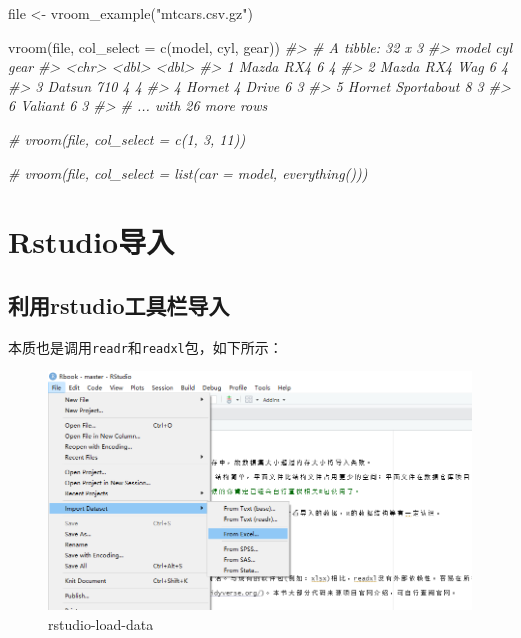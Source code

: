 \documentclass[
]{book}
\newenvironment{Shaded}{\begin{snugshade}}{\end{snugshade}}
\newcommand{\AttributeTok}[1]{\textcolor[rgb]{0.77,0.63,0.00}{#1}}
\newcommand{\CommentTok}[1]{\textcolor[rgb]{0.56,0.35,0.01}{\textit{#1}}}
\newcommand{\FunctionTok}[1]{\textcolor[rgb]{0.00,0.00,0.00}{#1}}
\newcommand{\NormalTok}[1]{#1}
\newcommand{\OtherTok}[1]{\textcolor[rgb]{0.56,0.35,0.01}{#1}}
\newcommand{\StringTok}[1]{\textcolor[rgb]{0.31,0.60,0.02}{#1}}
\begin{document}
\begin{Shaded}
\begin{Highlighting}[]
\NormalTok{file }\OtherTok{\textless{}{-}} \FunctionTok{vroom\_example}\NormalTok{(}\StringTok{"mtcars.csv.gz"}\NormalTok{)}

\FunctionTok{vroom}\NormalTok{(file, }\AttributeTok{col\_select =} \FunctionTok{c}\NormalTok{(model, cyl, gear))}
\CommentTok{\#\textgreater{} \# A tibble: 32 x 3}
\CommentTok{\#\textgreater{}   model               cyl  gear}
\CommentTok{\#\textgreater{}   \textless{}chr\textgreater{}             \textless{}dbl\textgreater{} \textless{}dbl\textgreater{}}
\CommentTok{\#\textgreater{} 1 Mazda RX4             6     4}
\CommentTok{\#\textgreater{} 2 Mazda RX4 Wag         6     4}
\CommentTok{\#\textgreater{} 3 Datsun 710            4     4}
\CommentTok{\#\textgreater{} 4 Hornet 4 Drive        6     3}
\CommentTok{\#\textgreater{} 5 Hornet Sportabout     8     3}
\CommentTok{\#\textgreater{} 6 Valiant               6     3}
\CommentTok{\#\textgreater{} \# ... with 26 more rows}

\CommentTok{\# vroom(file, col\_select = c(1, 3, 11))}

\CommentTok{\# vroom(file, col\_select = list(car = model, everything()))}
\end{Highlighting}
\end{Shaded}

\hypertarget{data:rstudio-addins}{%
\section{Rstudio导入}\label{data:rstudio-addins}}

\hypertarget{ux5229ux7528rstudioux5de5ux5177ux680fux5bfcux5165}{%
\subsection{利用rstudio工具栏导入}\label{ux5229ux7528rstudioux5de5ux5177ux680fux5bfcux5165}}

本质也是调用\texttt{readr}和\texttt{readxl}包，如下所示：

\begin{figure}
\centering
\includegraphics{picture/read-write/Rstudio-load-data.png}
\caption{rstudio-load-data}
\end{figure}
\end{document}
